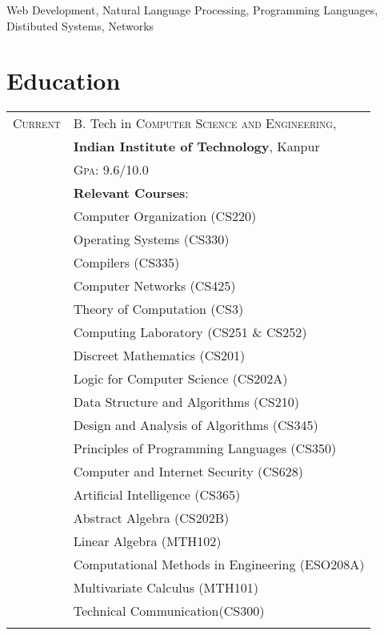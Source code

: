 \documentclass[a4paper,10pt]{article} %
\begin{document}
Web Development, Natural Language Processing, Programming Languages, Distibuted Systems,
Networks

\section{Education}

\begin{tabular}{rl}

    \textsc{Current} & B. Tech in \textsc{Computer Science and Engineering},\\
                     & \textbf{Indian Institute of Technology}, Kanpur\\
                     & \normalsize \textsc{Gpa}: 9.6/10.0 \\
                     & \textbf{Relevant Courses}: \\
                     & Computer Organization (CS220) \\
                    & Operating Systems (CS330) \\
                    & Compilers (CS335) \\
                    & Computer Networks (CS425) \\
                    & Theory of Computation (CS3) \\
                    & Computing Laboratory (CS251 \& CS252)\\
                    & Discreet Mathematics (CS201)\\
                    & Logic for Computer Science (CS202A)\\
                    & Data Structure and Algorithms (CS210)\\
                    & Design and Analysis of Algorithms (CS345)\\
                    & Principles of Programming Languages (CS350)\\
                    & Computer and Internet Security (CS628)\\
                    & Artificial Intelligence (CS365)\\
                    & Abstract Algebra (CS202B)\\
                    & Linear Algebra (MTH102)\\
                    & Computational Methods in Engineering (ESO208A)\\
                    & Multivariate Calculus (MTH101)\\
                    & Technical Communication(CS300)\\
                     \\


\end{tabular}
\end{document}
